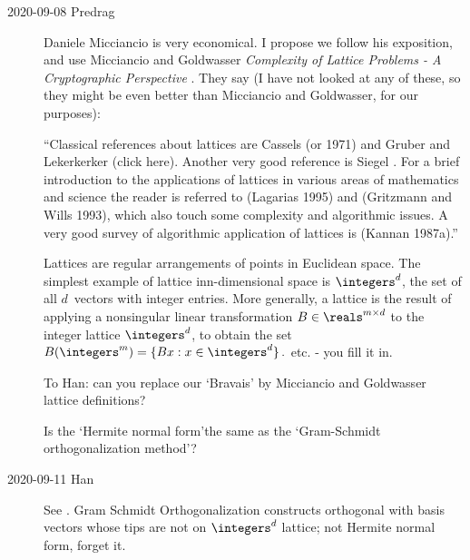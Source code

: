 \begin{description}
\item[2020-09-08 Predrag]
{Daniele Micciancio} is very economical. I propose we follow his exposition, and
use Micciancio and Goldwasser {\em Complexity of Lattice
Problems - A Cryptographic Perspective} . They
say (I have not looked at any of these, so they might be even better
than Micciancio and Goldwasser, for our purposes):

``Classical references about lattices are Cassels (or 1971)
 and Gruber and Lekerkerker
 {(click here)}. Another
very good reference is Siegel . For a
brief introduction to the applications of lattices in various areas of
mathematics and science the reader is referred to (Lagarias 1995) and
(Gritzmann and Wills 1993), which also touch some complexity and
algorithmic issues. A very good survey of algorithmic application of
lattices is (Kannan 1987a).''

Lattices are regular arrangements of points in Euclidean space.  The
simplest example of lattice inn-dimensional space is $\integers^d$, the
set of all $d$\dmn\ vectors with integer entries. More generally, a
lattice is the result of applying a nonsingular linear transformation
$B\in{\reals^{m\times{d}}}$ to the integer lattice $\integers^d$, to
obtain the set
\(
B(\integers^m) =\{Bx:x\in \integers^d\}
\,.
\)
etc. - you fill it in.

To Han: can you replace our `Bravais' by Micciancio and
Goldwasser lattice definitions?

Is the `Hermite
normal form'the same as the `Gram-Schmidt orthogonalization method'?

\item[2020-09-11 Han]
See .
Gram Schmidt Orthogonalization constructs orthogonal with
basis vectors whose tips are not on $\integers^d$ lattice; not Hermite
normal form, forget it.




\end{description}
